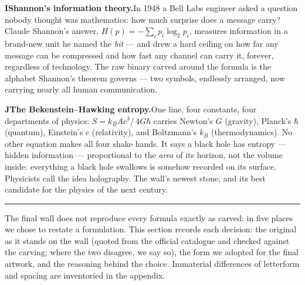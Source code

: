 \documentclass[10pt]{article}
\newcommand{\head}[1]{\par\vspace{7pt}{\noindent\large\bfseries #1}\par
  \vspace{1pt}\noindent\rule{\linewidth}{0.4pt}\par\vspace{2pt}}
\begin{document}
\textbf{I\quad Shannon's information theory.}\enspace In 1948 a Bell
Labs engineer asked a question nobody thought was mathematics: how much
surprise does a message carry? Claude Shannon's answer,
$H(p) = -\sum_i p_i \log_2 p_i$, measures information in a brand-new
unit he named the \emph{bit} --- and drew a hard ceiling on how far any
message can be compressed and how fast any channel can carry it,
forever, regardless of technology. The raw binary carved around the
formula is the alphabet Shannon's theorem governs --- two symbols,
endlessly arranged, now carrying nearly all human communication.

\textbf{J\quad The Bekenstein--Hawking entropy.}\enspace One line, four
constants, four departments of physics:
$S = k_B A c^3\!/\,4G\hbar$ carries Newton's $G$ (gravity), Planck's
$\hbar$ (quantum), Einstein's $c$ (relativity), and Boltzmann's $k_B$
(thermodynamics). No other equation makes all four shake hands. It says
a black hole has entropy --- hidden information --- proportional to the
\emph{area} of its horizon, not the volume inside: everything a black
hole swallows is somehow recorded on its surface. Physicists call the
idea holography. The wall's newest stone, and its best candidate for
the physics of the next century.

\head{3\quad Restated and amended formulations}
The final wall does not reproduce every formula exactly as carved: in
five places we chose to restate a formulation. This section records
each decision: the original as it stands on the wall (quoted from the
official catalogue and checked against the carving; where the two
disagree, we say so), the form we adopted for the final artwork, and
the reasoning behind the choice. Immaterial differences of letterform
and spacing are inventoried in the appendix.
\end{document}
